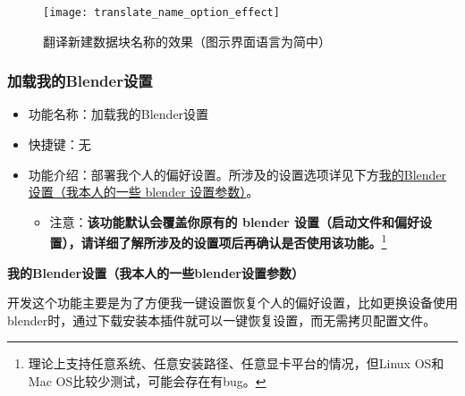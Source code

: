 \documentclass{../../public_resources/doc}
\begin{document}
\begin{figure}[h!]
    \texttt{[image: translate\_name\_option\_effect]}
    \caption{翻译新建数据块名称的效果（图示界面语言为简中）}
    \label{翻译新建数据块名称的效果（图示界面语言为简中）}
\end{figure}

\subsubsection{加载我的Blender设置}
\begin{itemize}
    \item 功能名称：加载我的Blender设置
    \item 快捷键：无
    \item 功能介绍：部署我个人的偏好设置。所涉及的设置选项详见下方\hyperlink{MySettings}{我的Blender设置（我本人的一些 blender 设置参数）}。
    \begin{itemize}
        \item 注意：\textbf{该功能默认会覆盖你原有的 blender 设置（启动文件和偏好设置），请详细了解所涉及的设置项后再确认是否使用该功能。}\footnote{理论上支持任意系统、任意安装路径、任意显卡平台的情况，但Linux OS和Mac OS比较少测试，可能会存在有bug。}
    \end{itemize}
\end{itemize}

\noindent \textbf{我的Blender设置（我本人的一些blender设置参数）}

\hypertarget{MySettings}{}
开发这个功能主要是为了方便我一键设置恢复个人的偏好设置，比如更换设备使用blender时，通过下载安装本插件就可以一键恢复设置，而无需拷贝配置文件。
\end{document}
